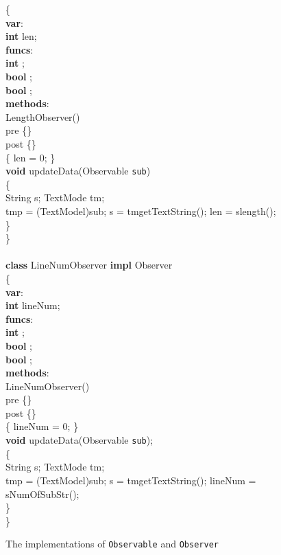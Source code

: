 \documentclass[fleqn]{llncs}
\begin{document}
\begin{figure}
\begin{center}
\begin{boxedminipage}{1\textwidth}
\begin{tabbing}
\{\\
\textbf{var}:\\
    \>\textbf{int} len;\\
\textbf{funcs}:\\
    \>\textbf{int} ;\\
    \>\textbf{bool} ;\\
    \>\textbf{bool} ;\\
\textbf{methods}:\\
    \>LengthObserver()\\
    \>  \>pre   \>\{\}\\
    \>  \>post  \>\{\}\\
    \>  \>\{ len = 0; \}\\
    \>\textbf{void} updateData(Observable \texttt{sub})\\
    \>  \>\{\\
    \>  \>   \>String s;  TextMode tm;\\
    \>  \>   \>tmp = (TextModel)sub;  s = tm\fldacc getTextString(); len = s{\fldacc}length();\\
    \>  \>\}\\
\}\\
\\
\textbf{class} LineNumObserver \textbf{impl} Observer\\
\{\\
\textbf{var}:\\
    \>\textbf{int} lineNum;\\
\textbf{funcs}:\\
    \>\textbf{int} ;\\
   \>\textbf{bool} ;\\
   \>\textbf{bool} ;\\
\textbf{methods}:\\
    \>LineNumObserver()\\
    \>  \>pre   \>\{\}\\
    \>  \>post  \>\{\}\\
    \>  \>\{ lineNum = 0; \}\\
    \>\textbf{void} updateData(Observable \texttt{sub});\\
    \>  \>\{\\
    \>  \>  \>String s;  TextMode tm;\\
    \>  \>  \>tmp = (TextModel)sub;  s = tm\fldacc getTextString(); lineNum = s{\fldacc}NumOfSubStr();\\
    \>  \>\}\\
\}

\end{tabbing}
\end{boxedminipage}
\end{center}
\caption{The implementations of \texttt{Observable} and \texttt{Observer}}\label{FIG-OBSERVER-IMP}
\end{figure}
\end{document}

